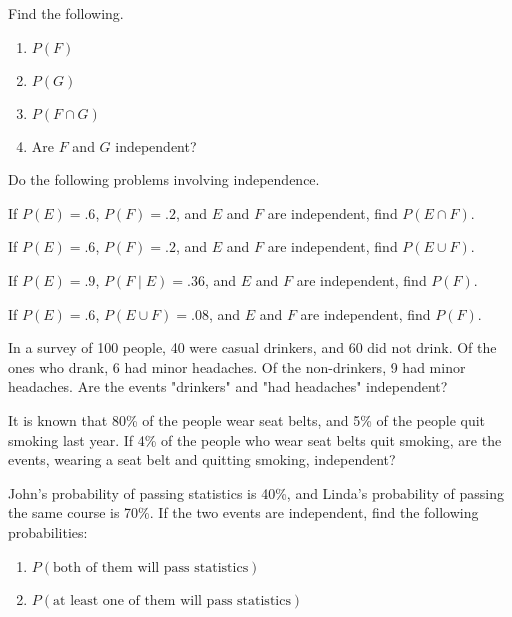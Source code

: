 \begin{puzzle}
    Find the following.
    \begin{enumerate}
        \item \( P(F) \)
        \item \( P(G) \)
        \item \( P(F \cap G) \)
        \item Are \( F \) and \( G \) independent?
    \end{enumerate}
\end{puzzle}

Do the following problems involving independence.

\begin{puzzle}
    If \( P(E) = .6 \), \( P(F) = .2 \), and \( E \) and \( F \) are independent, find \( P(E \cap F) \).
\end{puzzle}

\begin{puzzle}
    If \( P(E) = .6 \), \( P(F) = .2 \), and \( E \) and \( F \) are independent, find \( P(E \cup F) \).
\end{puzzle}

\begin{puzzle}
    If \( P(E) = .9 \), \( P(F \mid E) = .36 \), and \( E \) and \( F \) are independent, find \( P(F) \).
\end{puzzle}

\begin{puzzle}
    If \( P(E) = .6 \), \( P(E \cup F) = .08 \), and \( E \) and \( F \) are independent, find \( P(F) \).
\end{puzzle}

\begin{puzzle}
    In a survey of 100 people, 40 were casual drinkers, and 60 did not drink. Of the ones who drank, 6 had minor headaches. Of the non-drinkers, 9 had minor headaches. Are the events "drinkers" and "had headaches" independent?
\end{puzzle}

\begin{puzzle}
    It is known that 80\% of the people wear seat belts, and 5\% of the people quit smoking last year. If 4\% of the people who wear seat belts quit smoking, are the events, wearing a seat belt and quitting smoking, independent?
\end{puzzle}

\begin{puzzle}
    John's probability of passing statistics is 40\%, and Linda's probability of passing the same course is 70\%. If the two events are independent, find the following probabilities:
    \begin{enumerate}
        \item \( P(\text{both of them will pass statistics}) \)
        \item \( P(\text{at least one of them will pass statistics}) \)
    \end{enumerate}
\end{puzzle}

